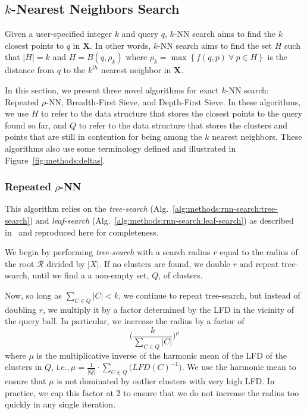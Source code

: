 \subsection{\texorpdfstring{$k$}{k}-Nearest Neighbors Search}
\label{sec:methods:knn-search}

Given a user-specified integer $k$ and query $q$, $k$-NN search aims to find the $k$ closest points to $q$ in $\textbf{X}$.
In other words, $k$-NN search aims to find the set $H$ such that $|H| = k$ and $H = B(q, \rho_k)$ where $\rho_k = \max \left\{ f(q, p) \ \forall \ p \in H \right\}$ is the distance from $q$ to the $k^{th}$ nearest neighbor in $\textbf{X}$.

In this section, we present three novel algorithms for exact $k$-NN search:
Repeated $\rho$-NN, Breadth-First Sieve, and Depth-First Sieve.
In these algorithms, we use $H$ to refer to the data structure that stores the closest points to the query found so far, and $Q$ to refer to the data structure that stores the clusters and points that are still in contention for being among the $k$ nearest neighbors.
These algorithms also use some terminology defined and illustrated in Figure~\ref{fig:methods:deltas}.


\subsubsection{Repeated \texorpdfstring{$\rho$}{p}-NN}
\label{sec:methods:knn-search:repeated-rnn}

This algorithm relies on the \textit{tree-search} (Alg.~\ref{alg:methods:rnn-search:tree-search}) and \textit{leaf-search} (Alg.~\ref{alg:methods:rnn-search:leaf-search}) as described in~\cite{ishaq2019clustered} and reproduced here for completeness.

We begin by performing \textit{tree-search} with a search radius $r$ equal to the radius of the root $\mathcal{R}$ divided by $|X|$.
If no clusters are found, we double $r$ and repeat tree-search, until we find a a non-empty set, $Q$, of clusters.

Now, so long as $\sum_{C \in Q} |C| < k$, we continue to repeat tree-search, but instead of doubling $r$, we multiply it by a factor determined by the LFD in the vicinity of the query ball.
In particular, we increase the radius by a factor of
\begin{equation}
  \bigg( {\frac{k}{\sum_{C \in Q} |C|}} \bigg)^{\mu}
  \label{eq:methods:repeated-rnn-factor}
\end{equation}
where $\mu$ is the multiplicative inverse of the harmonic mean of the LFD of the clusters in $Q$, i.e.,\,$\mu = \frac{1}{|Q|} \cdot \sum_{C \in Q} \big( LFD(C)^{-1} \big)$.
We use the harmonic mean to ensure that $\mu$ is not dominated by outlier clusters with very high LFD.
In practice, we cap this factor at 2 to ensure that we do not increase the radius too quickly in any single iteration.

